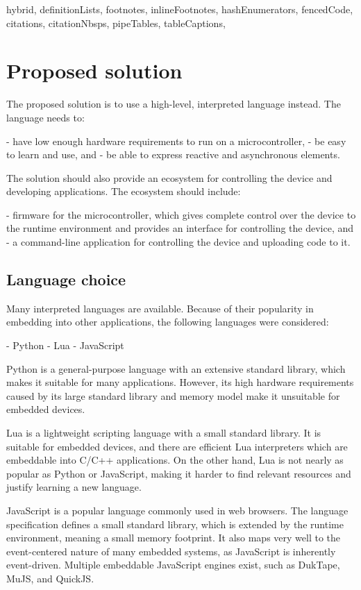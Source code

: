 \begin{markdown*}{%
  hybrid,
  definitionLists,
  footnotes,
  inlineFootnotes,
  hashEnumerators,
  fencedCode,
  citations,
  citationNbsps,
  pipeTables,
  tableCaptions,
}
\chapter{Proposed solution}

The proposed solution is to use a high-level, interpreted language instead. The language needs to:

  - have low enough hardware requirements to run on a microcontroller,
  - be easy to learn and use, and
  - be able to express reactive and asynchronous elements.

\noindent
The solution should also provide an ecosystem for controlling the device and developing applications. The ecosystem should include:

  - firmware for the microcontroller, which gives complete control over the device to the runtime environment and provides an interface for controlling the device, and
  - a command-line application for controlling the device and uploading code to it.

\section{Language choice}

Many interpreted languages are available. Because of their popularity in embedding into other applications, the following languages were considered:

  - Python
  - Lua
  - JavaScript

Python is a general-purpose language with an extensive standard library, which makes it suitable for many applications. However, its high hardware requirements caused by its large standard library and memory model make it unsuitable for embedded devices.

Lua is a lightweight scripting language with a small standard library. It is suitable for embedded devices, and there are efficient Lua interpreters which are embeddable into C/C++ applications. On the other hand, Lua is not nearly as popular as Python or JavaScript, making it harder to find relevant resources and justify learning a new language.

JavaScript is a popular language commonly used in web browsers. The language specification defines a small standard library, which is extended by the runtime environment, meaning a small memory footprint. It also maps very well to the event-centered nature of many embedded systems, as JavaScript is inherently event-driven. Multiple embeddable JavaScript engines exist, such as DukTape, MuJS, and QuickJS.


\end{markdown*}

